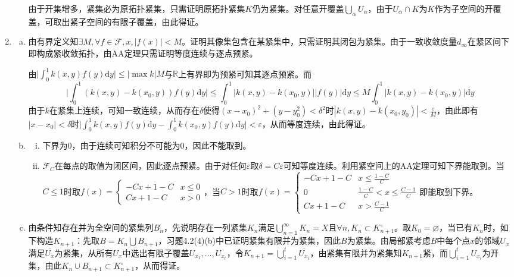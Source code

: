 \documentclass[a4paper,UTF8,fontset=windows]{ctexart}
\begin{document}
\begin{enumerate}[(1)]
\begin{enumerate}[(a)]
    由于开集增多，紧集必为原拓扑紧集，只需证明原拓扑紧集$K$仍为紧集。对任意开覆盖$\bigcup_\alpha U_\alpha$，由于$U_\alpha\cap K$为$K$作为子空间的开覆盖，可取出紧子空间的有限子覆盖，由此得证。
    \end{enumerate}
    
    \item
    \begin{enumerate}[(a)]
    \item
    由有界定义知$\exists M,\forall f\in\mathcal{F},x,|f(x)|<M$。证明其像集包含在某紧集中，只需证明其闭包为紧集。由于一致收敛度量$d_\infty$在紧区间下即构成紧收敛拓扑，由AA定理只需证明等度连续与逐点预紧。
    
    由$\big|\int_0^1k(x,y)f(y)\mathrm{d}y\big|\le|\max{k}|M$与$\mathbb{R}$上有界即为预紧可知其逐点预紧。而
    \[\bigg|\int_0^1(k(x,y)-k(x_0,y))f(y)\mathrm{d}y\bigg|\le\int_0^1|k(x,y)-k(x_0,y)||f(y)|\mathrm{d}y\le M\int_0^1|k(x,y)-k(x_0,y)|\mathrm{d}y\]
    由于$k$在紧集上连续，可知一致连续，从而存在$\delta$使得$(x-x_0)^2+(y-y_0^2)<\delta^2$时$|k(x,y)-k(x_0,y_0)|<\frac{\varepsilon}{M}$，由此即有$|x-x_0|<\delta$时$\big|\int_0^1k(x,y)f(y)\mathrm{d}y-\int_0^1k(x_0,y)f(y)\mathrm{d}y\big|<\varepsilon$，从而等度连续，由此得证。
    
    \item
    \begin{enumerate}[(i)]
    \item
    下界为0，由于连续可知积分不可能为0，因此不能取到。
    
    \item
    $\mathcal{F}_C$在每点的取值为闭区间，因此逐点预紧。由于对任何$\varepsilon$取$\delta=C\varepsilon$可知等度连续。利用紧空间上的AA定理可知下界能取到。当$C\le1$时取$f(x)=\begin{cases}-Cx+1-C&x\le0\\Cx+1-C&x>0\end{cases}$，当$C>1$时取$f(x)=\begin{cases}-Cx+1-C&x\le\frac{1-C}{C}\\0&\frac{1-C}{C}<x\le\frac{C-1}{C}\\Cx+1-C&x>\frac{C-1}{C}\end{cases}$即能取到下界。
    \end{enumerate}
    
    \item
    由条件知存在并为全空间的紧集列$B_n$，先说明存在一列紧集$K_n$满足$\bigcup_{n=1}^\infty K_n=X$且$\forall n, K_n\subset K_{n+1}^\circ$。取$K_0=\varnothing$，当已有$K_n$时，如下构造$K_{n+1}$：先取$B=K_n\bigcup B_{n+1}$，习题4.2(4)(b)中已证明紧集有限并为紧集，因此$B$为紧集。由局部紧考虑$B$中每个点$x$的邻域$U_x$满足$\overline{U_x}$为紧集，从所有$U_x$中选出有限子覆盖$U_{x_1},\dots,U_{x_t}$，令$K_{n+1}=\bigcup_{i=1}^t\overline{U_{x_i}}$，由紧集有限并为紧集知$K_{n+1}$紧，而$\bigcup_{i=1}^tU_{x_i}$为开集，由此$K_n\cup B_{n+1}\subset K_{n+1}^\circ$，从而得证。
    

\end{enumerate}
\end{enumerate}
\end{document}
